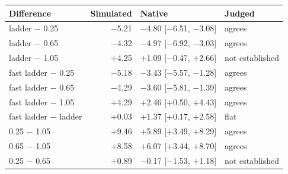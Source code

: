 \begin{tabular}{lrll}
\toprule
Difference & Simulated & Native & Judged \\
\midrule
ladder $-$ 0.25 & $-$5.21 & $-$4.80 [$-$6.51, $-$3.08] & agrees \\
ladder $-$ 0.65 & $-$4.32 & $-$4.97 [$-$6.92, $-$3.03] & agrees \\
ladder $-$ 1.05 & $+$4.25 & $+$1.09 [$-$0.47, $+$2.66] & not established \\
fast ladder $-$ 0.25 & $-$5.18 & $-$3.43 [$-$5.57, $-$1.28] & agrees \\
fast ladder $-$ 0.65 & $-$4.29 & $-$3.60 [$-$5.81, $-$1.39] & agrees \\
fast ladder $-$ 1.05 & $+$4.29 & $+$2.46 [$+$0.50, $+$4.43] & agrees \\
fast ladder $-$ ladder & $+$0.03 & $+$1.37 [$+$0.17, $+$2.58] & flat \\
0.25 $-$ 1.05 & $+$9.46 & $+$5.89 [$+$3.49, $+$8.29] & agrees \\
0.65 $-$ 1.05 & $+$8.58 & $+$6.07 [$+$3.44, $+$8.70] & agrees \\
0.25 $-$ 0.65 & $+$0.89 & $-$0.17 [$-$1.53, $+$1.18] & not established \\
\bottomrule
\end{tabular}
